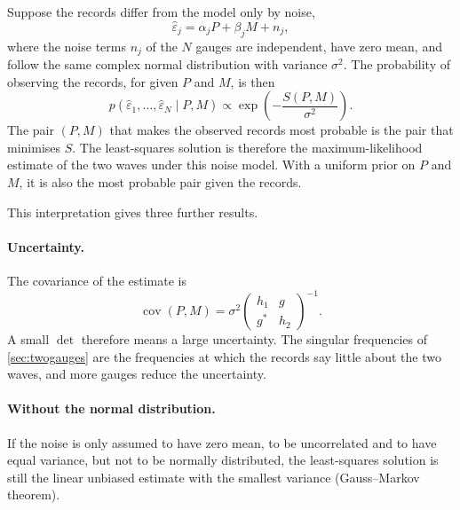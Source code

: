 \documentclass[11pt,a4paper,numbers=noenddot,abstract=true]{scrartcl}
\DeclareMathOperator{\cov}{cov}
\begin{document}
Suppose the records differ from the model only by noise,
\begin{equation}
  \hat\varepsilon_j = \alpha_j P + \beta_j M + n_j,
\end{equation}
where the noise terms $n_j$ of the $N$ gauges are independent, have zero mean, and follow the same complex normal
distribution with variance $\sigma^2$. The probability of observing the records, for given $P$ and $M$, is then
\begin{equation}
  p(\hat\varepsilon_1, \dots, \hat\varepsilon_N \mid P, M) \propto \exp\!\left(-\frac{S(P, M)}{\sigma^2}\right).
\end{equation}
The pair $(P, M)$ that makes the observed records most probable is the pair that minimises $S$. The least-squares
solution is therefore the maximum-likelihood estimate of the two waves under this noise model. With a uniform
prior on $P$ and $M$, it is also the most probable pair given the records.

This interpretation gives three further results.

\paragraph{Uncertainty.} The covariance of the estimate is
\begin{equation}
  \cov(P, M) = \sigma^2 \begin{pmatrix} h_1 & g \\ g^* & h_2 \end{pmatrix}^{-1}.
\end{equation}
A small $\det$ therefore means a large uncertainty. The singular frequencies of \cref{sec:twogauges} are the
frequencies at which the records say little about the two waves, and more gauges reduce the uncertainty.

\paragraph{Without the normal distribution.} If the noise is only assumed to have zero mean, to be uncorrelated
and to have equal variance, but not to be normally distributed, the least-squares solution is still the linear
unbiased estimate with the smallest variance (Gauss--Markov theorem).
\end{document}
